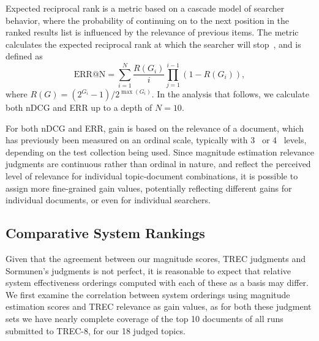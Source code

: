 Expected reciprocal rank is 
a
metric based on a cascade
model of searcher behavior, where the probability of continuing on to
the next position in the ranked results list is influenced by the
relevance of previous items. The metric calculates the expected
reciprocal rank at which the searcher will stop~\citep{ChaMet09}, and is defined
as
\[
  \mathrm{ ERR@N} = \sum^{N}_{i=1} \frac{R(G_i)}{i} \prod^{i-1}_{j=1}(1 - R(G_i)),
\]
\noindent where $R(G) = (2^{G_i}-1) / 2^{\max(G_i)}$. 
In the analysis that follows, we calculate both nDCG and ERR
up to a depth of $N=10$.

For both nDCG and ERR, gain is based on the relevance of a document,
which has previously been measured on an ordinal scale, typically with
3~\cite{KanAsl03} or 4~\cite{JarKek02} levels, depending on the test
collection being used.
Since magnitude estimation relevance judgments are continuous rather
than ordinal in nature, and reflect the perceived level of relevance
for individual topic-document combinations, it is possible to assign
more fine-grained gain values, potentially reflecting different gains
for individual documents, or even for individual searchers.

\subsection{Comparative System Rankings}
\label{sec:ranking-trec-runs}

Given that the agreement between our magnitude scores, TREC judgments
and Sormunen's judgments is not perfect, it is reasonable to expect
that relative system effectiveness orderings computed with each of
these as a basis may differ.
We first examine the correlation between system orderings using
magnitude estimation scores and TREC relevance as gain values, as for
both these judgment sets we have nearly complete coverage of the top 10
documents of all runs submitted to TREC-8, for our 18 judged topics.
% 

